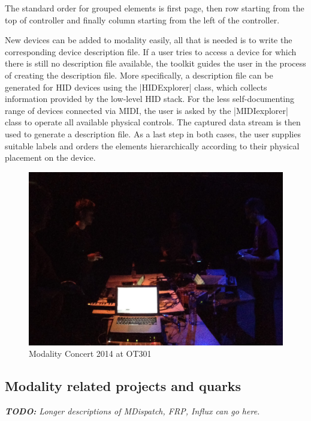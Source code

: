 \documentclass{article}
\newcommand{\todo}[1] {\emph{\textbf{TODO:} #1}}
\begin{document}
The standard order for grouped elements is first page, then row starting from the top of controller and finally column starting from the left of the controller.

New devices can be added to modality easily, all that is needed is to write the corresponding device description file. 
If a user tries to access a device for which there is still no description file available, the toolkit guides the user in the process of creating the description file. 
More specifically, a description file can be generated for HID devices using the |HIDExplorer| class, which collects information provided by the low-level HID stack. 
For the less self-documenting range of devices connected via MIDI, the user is asked by the |MIDIexplorer| class to operate all available physical controls. 
The captured data stream is then used to generate a description file.
As a last step in both cases, the user supplies suitable labels and orders the elements hierarchically according to their physical placement on the device.




\begin{figure}[h]
	\centering
		\includegraphics[width=.9\columnwidth]{../media/20140405-IMG_1691.jpg}
	\caption{Modality Concert 2014 at OT301}
	\label{fig:media_20140405-IMG_1691}
\end{figure}

\subsection{Modality related projects and quarks} 

\todo {Longer descriptions of MDispatch, FRP, Influx can go here.}
\end{document}
